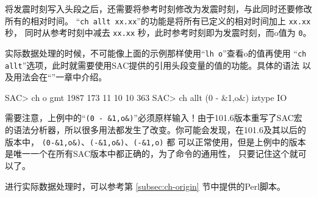 将发震时刻写入头段之后，还需要将参考时刻修改为发震时刻，与此同时还要修改所有的相对时间。
``\texttt{ch allt xx.xx}''的功能是将所有已定义的相对时间加上 \texttt{xx.xx} 秒，
同时从参考时刻中减去 \texttt{xx.xx} 秒，此时参考时刻即为发震时刻，而o值为 \texttt{0}。

实际数据处理的时候，不可能像上面的示例那样使用``\texttt{lh o}''查看o的值再使用
``\texttt{ch allt}''选项，此时就需要使用SAC提供的引用头段变量的值的功能。具体的语法
以及用法会在``''一章中介绍。

\begin{SACCode}
SAC> ch o gmt 1987 173 11 10 10 363
SAC> ch allt (0 - &1,o&) iztype IO
\end{SACCode}

需要注意，上例中的``\verb|(0 - &1,o&)|''必须原样输入！由于101.6版本重写了SAC宏
的语法分析器，所以很多用法都发生了改变。你可能会发现，在101.6及其以后的版本中，
\verb|(0-&1,o&)|、\verb|(-&1,o&)|、\verb|(-&1,o)| 都
可以正常使用，但是上例中的版本是唯一一个在所有SAC版本中都正确的，为了命令的通用性，
只要记住这个就可以了。

进行实际数据处理时，可以参考第 \ref{subsec:ch-origin} 节中提供的Perl脚本。
